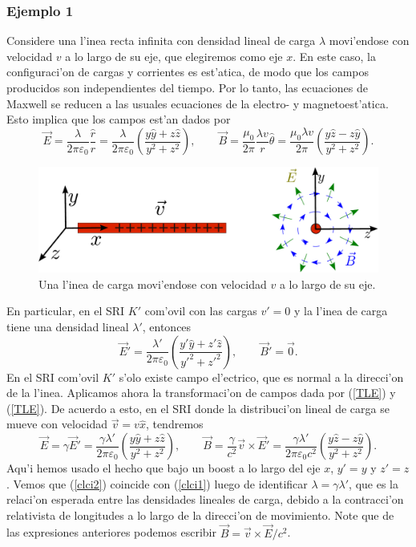 \subsubsection{Ejemplo 1}
Considere una l'inea recta infinita con densidad lineal de carga $\lambda$ movi'endose con velocidad $v$ a lo largo de su eje, que elegiremos como eje $x$. En este caso, la configuraci'on de cargas y corrientes es est'atica, de modo que los campos producidos son independientes del tiempo. Por lo tanto, las ecuaciones de Maxwell se reducen a las usuales ecuaciones de la electro- y magnetoest'atica. Esto implica que los campos est'an dados por
\begin{equation}
 \vec{E}=\frac{\lambda}{2\pi\varepsilon_0}\frac{\hat{r}}{r}=\frac{\lambda}{2\pi\varepsilon_0}\left( \frac{y\hat{y}+z\hat{z}}{y^2+z^2}\right) , \qquad \vec{B}=\frac{\mu_0}{2\pi}\frac{\lambda v}{r}\hat\theta=\frac{\mu_0\lambda v}{2\pi}\left( \frac{y\hat{z}-z\hat{y}}{y^2+z^2}\right) . \label{clci1}
\end{equation}
\begin{center}
\begin{figure}[H]
\centerline{\includegraphics[height=3.5cm]{fig/fig-boost-campos-01.pdf}}
\caption{Una l'inea de carga movi'endose con velocidad $v$ a lo largo de su eje.} \label{fig:bc01}
\end{figure}
\end{center}
En particular, en el SRI $K'$ com'ovil con las cargas $v'=0$ y la l'inea de carga tiene una densidad lineal $\lambda'$, entonces
\begin{equation}
 \vec{E}'=\frac{\lambda'}{2\pi\varepsilon_0}\left( \frac{y'\hat{y}+z'\hat{z}}{y'^2+z'^2}\right) , \qquad \vec{B}'=\vec{0}.
\end{equation}
En el SRI com'ovil $K'$ s'olo existe campo el'ectrico, que es normal a la direcci'on de la l'inea. Aplicamos ahora la transformaci'on de campos dada por (\ref{TLE}) y (\ref{TLE}). De acuerdo a esto, en el SRI donde la distribuci'on lineal de carga se mueve con velocidad $\vec{v}=v\hat{x}$, tendremos
\begin{equation}
 \vec{E}=\gamma\vec{E}'=\frac{\gamma\lambda'}{2\pi\varepsilon_0}\left( \frac{y\hat{y}+z\hat{z}}{y^2+z^2}\right) , \qquad \vec{B}= \frac{\gamma}{c^2}\vec{v}\times\vec{E}'=\frac{\gamma\lambda'}{2\pi\varepsilon_0c^2}\left( \frac{y\hat{z}-z\hat{y}}{y^2+z^2}\right). \label{clci2}
\end{equation}
Aqu'i hemos usado el hecho que bajo un boost a lo largo del eje $x$, $y'=y$ y $z'=z$. Vemos que (\ref{clci2}) coincide con (\ref{clci1}) luego de identificar $\lambda=\gamma\lambda'$, que es la relaci'on esperada entre las densidades lineales de carga, debido a la contracci'on relativista de longitudes a lo largo de la direcci'on de movimiento. Note que de las expresiones anteriores podemos escribir  $\vec{B}=\vec{v}\times\vec{E}/c^2$.

